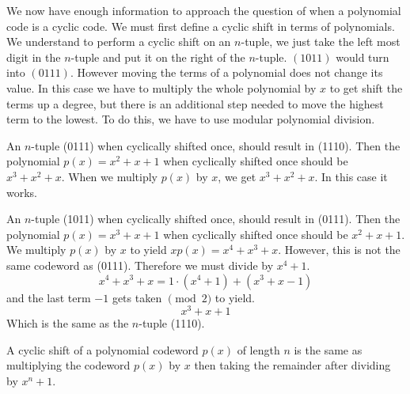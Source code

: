 We now have enough information to approach the question of when a polynomial code is a cyclic code.  We must first define a cyclic shift in terms of polynomials.  We understand to perform a cyclic shift on an $n$-tuple, we just take the left most digit in the $n$-tuple and put it on the right of the $n$-tuple.  $(1011)$ would turn into $(0111)$.  However moving the terms of a polynomial does not change its value.  In this case we have to multiply the whole polynomial by $x$ to get shift the terms up a degree, but there is an additional step needed to move the highest term to the lowest.  To do this, we have to use modular polynomial division.  

\begin {example}{}
An $n$-tuple (0111) when cyclically shifted once, should result in (1110).  Then the polynomial $p(x) = x^2 + x + 1$ when cyclically shifted once should be $x^3 + x^2 + x$.  When we multiply $p(x)$ by $x$, we get $x^3 + x^2 + x$.  In this case it works.

An $n$-tuple (1011) when cyclically shifted once, should result in (0111).  Then the polynomial $p(x) = x^3 + x + 1$ when cyclically shifted once should be $x^2 + x + 1$.  We multiply $p(x)$ by $x$ to yield $xp(x) = x^4 + x^3 + x$.  However, this is not the same codeword as (0111).  Therefore we must divide by $x^4 + 1$.
\[x^4 + x^3 + x = 1\cdot (x^4 + 1) + (x^3 + x - 1)\]
and the last term $-1$ gets taken $\pmod 2$ to yield.
\[x^3 + x + 1\]
Which is the same as the $n$-tuple (1110).
\end{example}

\begin {prop}{}
A cyclic shift of a polynomial codeword $p(x)$ of length $n$ is the same as multiplying the codeword $p(x)$ by $x$ then taking the remainder after dividing by $x^n + 1$.
\end{prop}

